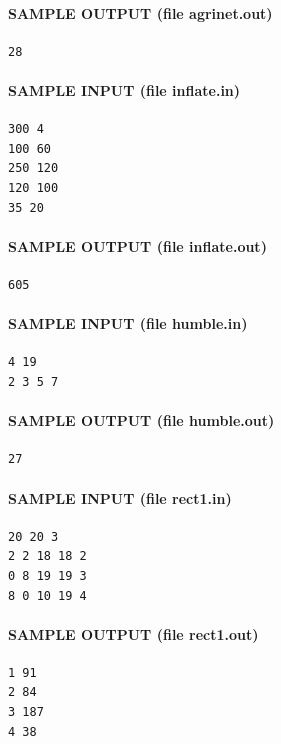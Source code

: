 \documentclass[11pt]{article}
\begin{document}
\paragraph{SAMPLE OUTPUT (file agrinet.out)}
\begin{verbatim}
28
\end{verbatim}

\paragraph{SAMPLE INPUT (file inflate.in)}
\begin{verbatim}
300 4
100 60
250 120
120 100
35 20
\end{verbatim}

\paragraph{SAMPLE OUTPUT (file inflate.out)}
\begin{verbatim}
605
\end{verbatim}

\paragraph{SAMPLE INPUT (file humble.in)}
\begin{verbatim}
4 19
2 3 5 7
\end{verbatim}

\paragraph{SAMPLE OUTPUT (file humble.out)}
\begin{verbatim}
27
\end{verbatim}

\paragraph{SAMPLE INPUT (file rect1.in)}
\begin{verbatim}
20 20 3
2 2 18 18 2
0 8 19 19 3
8 0 10 19 4
\end{verbatim}

\paragraph{SAMPLE OUTPUT (file rect1.out)}
\begin{verbatim}
1 91
2 84
3 187
4 38
\end{verbatim}
\end{document}

